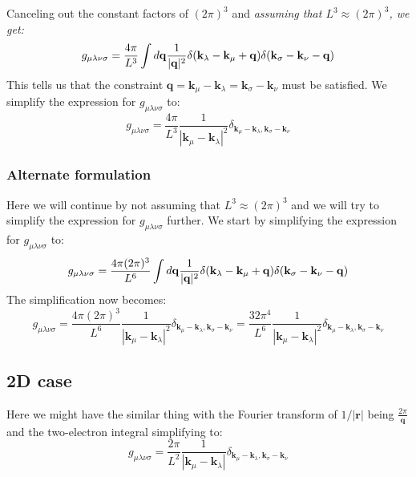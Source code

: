 \documentclass[12pt]{article}
\begin{document}
Canceling out the constant factors of $(2\pi)^3$ and \emph{assuming that $L^3 \approx (2\pi)^3$, we get:}
\begin{equation}
    g_{\mu\lambda\nu\sigma} = \frac{4\pi}{L^3} \int d\mathbf{q} \frac{1}{|\vb{q}|^2} \delta(\mathbf{k}_\lambda - \mathbf{k}_\mu + \mathbf{q}) \delta(\mathbf{k}_\sigma - \mathbf{k}_\nu - \mathbf{q})
\end{equation}
This tells us that the constraint $\mathbf{q} = \mathbf{k}_\mu - \mathbf{k}_\lambda = \mathbf{k}_\sigma - \mathbf{k}_\nu$ must be satisfied. We simplify the expression for $g_{\mu\lambda\nu\sigma}$ to:
\begin{equation}
    g_{\mu\lambda\nu\sigma} = \frac{4\pi}{L^3} \frac{1}{|\mathbf{k}_\mu - \mathbf{k}_\lambda|^2} \delta_{\mathbf{k}_\mu - \mathbf{k}_\lambda, \mathbf{k}_\sigma - \mathbf{k}_\nu}
\end{equation}
\subsubsection{Alternate formulation}
Here we will continue by not assuming that $L^3 \approx (2\pi)^3$ and we will try to simplify the expression for $g_{\mu\lambda\nu\sigma}$ further. We start by simplifying the expression for $g_{\mu\lambda\nu\sigma}$ to:
\begin{equation}
    g_{\mu\lambda\nu\sigma} = \frac{4\pi(2\pi)^3}{L^6} \int d\mathbf{q} \frac{1}{|\vb{q}|^2} \delta(\mathbf{k}_\lambda - \mathbf{k}_\mu + \mathbf{q}) \delta(\mathbf{k}_\sigma - \mathbf{k}_\nu - \mathbf{q})
\end{equation}
The simplification now becomes:
\begin{equation}
    g_{\mu\lambda\nu\sigma} = \frac{4\pi(2\pi)^3}{L^6} \frac{1}{|\mathbf{k}_\mu - \mathbf{k}_\lambda|^2} \delta_{\mathbf{k}_\mu - \mathbf{k}_\lambda, \mathbf{k}_\sigma - \mathbf{k}_\nu} = \frac{32\pi^4}{L^6} \frac{1}{|\mathbf{k}_\mu - \mathbf{k}_\lambda|^2} \delta_{\mathbf{k}_\mu - \mathbf{k}_\lambda, \mathbf{k}_\sigma - \mathbf{k}_\nu}
\end{equation}

\subsection{2D case}
Here we might have the similar thing with the Fourier transform of $1/|\mathbf{r}|$ being $\frac{2\pi}{\mathbf{q}}$ and the two-electron integral simplifying to:
\begin{equation}
    g_{\mu\lambda\nu\sigma} = \frac{2\pi}{L^2} \frac{1}{|\mathbf{k}_\mu - \mathbf{k}_\lambda|} \delta_{\mathbf{k}_\mu - \mathbf{k}_\lambda, \mathbf{k}_\sigma - \mathbf{k}_\nu}
\end{equation}
\end{document}
